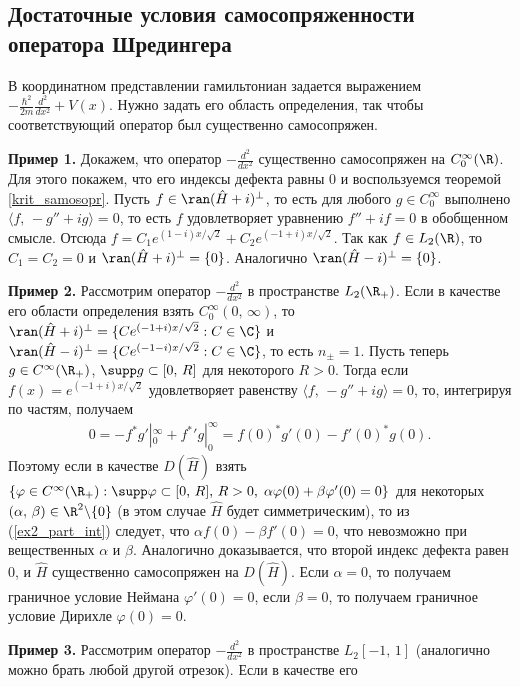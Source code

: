 \documentclass[a4paper
]{article}
\begin{document}
\subsection{Достаточные условия самосопряженности оператора Шредингера}
В координатном представлении гамильтониан задается выражением
$-\frac{\hbar^2}{2m}\frac{d^2}{dx^2}+V(x)$. Нужно задать его область
определения, так чтобы соответствующий оператор был существенно
самосопряжен. \par
{\bf Пример 1.} Докажем, что оператор $-\frac{d^2}{dx^2}$ существенно
самосопряжен на $C_0^\infty(\R)$. Для этого покажем, что его
индексы дефекта равны 0 и воспользуемся теоремой \ref{krit_samosopr}.
Пусть $f\in \ran(\hat H+i)^{\bot}$, то есть для любого $g\in C_0^\infty$
выполнено $\langle f, \, -g''+ig\rangle=0$, то есть $f$ удовлетворяет
уравнению $f''+if=0$ в обобщенном смысле. Отсюда $f=C_1e^{(1-i)x/\sqrt{2}}
+C_2e^{(-1+i)x/\sqrt{2}}$. Так как $f\in L_2(\R)$, то $C_1=C_2=0$ и
$\ran(\hat H+i)^{\bot}=\{0\}$. Аналогично $\ran(\hat H-i)^{\bot}=\{0\}$. \par
{\bf Пример 2.} Рассмотрим оператор $-\frac{d^2}{dx^2}$ в пространстве $L_2(\R_+)$.
Если в качестве его области определения взять $C_0^\infty(0, \, \infty)$,
то $\ran(\hat H+i)^{\bot}=\{Ce^{(-1+i)x/\sqrt{2}}:C\in \C\}$ и $\ran(\hat
H-i)^{\bot}=\{Ce^{(-1-i)x/\sqrt{2}}:C\in \C\}$, то есть $n_{\pm}=1$.
Пусть теперь $g\in C^\infty(\R_+)$, $\supp g\subset [0, \, R]$ для
некоторого $R>0$. Тогда если $f(x)=e^{(-1+i)x/\sqrt{2}}$ удовлетворяет
равенству $\langle f, \, -g''+ig\rangle=0$, то, интегрируя по частям,
получаем
\begin{align}
\label{ex2_part_int}
0=-f^*g'|_0^\infty+{f^*}'g|_0^\infty=f(0)^*g'(0)-f'(0)^*g(0).
\end{align}
Поэтому если в качестве $D(\hat H)$ взять $\{\varphi\in C^\infty(\R_+):
\supp \varphi\subset [0, \, R], \, R>0,\; \alpha \varphi(0)+\beta
\varphi'(0)=0\}$ для некоторых $(\alpha, \, \beta)\in \R^2\backslash\{0\}$
(в этом случае $\hat H$ будет симметрическим), то из (\ref{ex2_part_int})
следует, что $\alpha f(0)-\beta f'(0)=0$, что невозможно при вещественных
$\alpha$ и $\beta$. Аналогично доказывается, что второй индекс дефекта
равен 0, и $\hat H$ существенно самосопряжен на $D(\hat H)$. Если
$\alpha=0$, то получаем граничное условие Неймана $\varphi'(0)=0$, если
$\beta=0$, то получаем граничное условие Дирихле $\varphi(0)=0$. \par
{\bf Пример 3.} Рассмотрим оператор $-\frac{d^2}{dx^2}$ в пространстве $L_2[-1, \, 1]$
(аналогично можно брать любой другой отрезок). Если в качестве его
\end{document}

